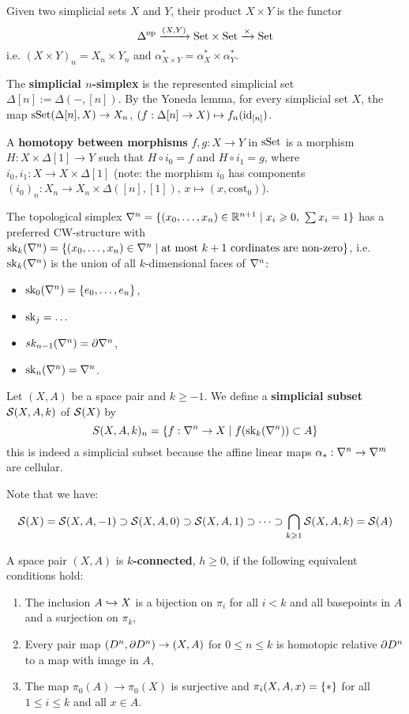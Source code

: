 

Given two simplicial sets $X$ and $Y$, their product $X\times Y$ is the functor \[\Delta^\op\xto{(X,Y)}\Set\times\Set\xto{\times}\Set\] i.e. $(X\times Y)_n=X_n\times Y_n$ and $\alpha^*_{X\times Y}=\alpha^*_X\times\alpha^*_Y$.

The \textbf{simplicial $n$-simplex} is the represented simplicial set $\Delta[n]:=\Delta(-,[n])$. By the Yoneda lemma, for every simplicial set $X$, the map $\sSet(\Delta[n],X)\to X_n$, $(f:\Delta[n]\to X)\mapsto f_n(\id_{[n]})$.

A \textbf{homotopy between morphisms} $f,g:X\to Y$ in $\sSet$ is a morphism $H:X\times\Delta[1]\to Y$ such that $H\circ i_0=f$ and $H\circ i_1=g$, where $i_0,i_1:X\to X\times\Delta[1]$ (note: the morphism $i_0$ has components $(i_0)_n:X_n\to X_n\times\Delta([n],[1])$, $x\mapsto(x,\text{cost}_0)$).

The topological simplex $\nabla^n=\cb{(\xso)\in\R^{n+1}\mid x_i\geq0,\ \sum x_i=1}$ has a preferred CW-structure with $\sk_k(\nabla^n)=\cb{(\xso)\in\nabla^n\mid\text{at most }k+1\text{ cordinates are non-zero}}$, i.e. $\sk_k(\ns)$ is the union of all $k$-dimensional faces of $\ns$:
\begin{itemize}
    \item $\sk_0(\nabla^n)=\cb{\nno{e}{n}}$,
    \item $\sk_j=\dots$
    \item $sk_{n-1}(\nabla^n)=\de\nabla^n$,
    \item $\sk_n(\nabla^n)=\nabla^n$.
\end{itemize}\medskip

Let $(X,A)$ be a space pair and $k\geq-1$. We define a \textbf{simplicial subset} $\S(X,A,k)$ of $\S(X)$ by
\[S(X,A,k)_n=\cb{f:\ns\to X\mid f(\sk_k(\ns))\subset A}\]
this is indeed a simplicial subset because the affine linear maps $\alpha_*:\ns\to\ms$ are cellular.

Note that we have:

\[\S(X)=\S(X,A,-1)\supset \S(X,A,0)\supset \S(X,A,1)\supset\dots\supset\bigcap_{k\geq1}\S(X,A,k)=\S(A)\]

A space pair $(X,A)$ is \textbf{$k$-connected}, $h\geq0$, if the following equivalent conditions hold:
\begin{enumerate}[label={(\alph*)},topsep=0.5\thmsep]
    \item The inclusion $A\hto X$ is a bijection on $\pi_i$ for all $i<k$ and all basepoints in $A$ and a surjection on $\pi_k$,
    \item Every pair map $(D^n,\de D^n)\to (X,A)$ for $0\leq n\leq k$ is homotopic relative $\de D^n$ to a map with image in $A$,
    \item The map $\pi_0(A)\to \pi_0(X)$ is surjective and $\pi_i(X,A,x)=\cb{*}$ for all $1\leq i\leq k$ and all $x\in A$.
\end{enumerate}

